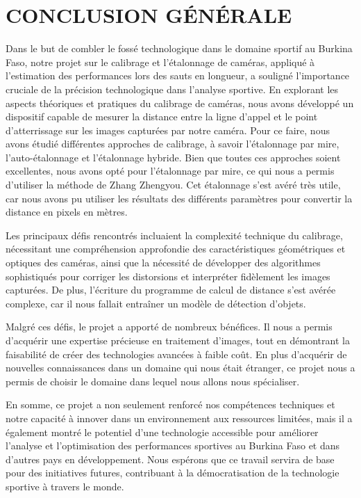 \chapter*{CONCLUSION GÉNÉRALE}
\adjustmtc
\thispagestyle{MyStyle}


 Dans le but de combler le fossé technologique dans le domaine sportif au Burkina Faso, notre projet sur le calibrage et l'étalonnage de caméras, appliqué à l'estimation des performances lors des sauts en longueur, a souligné l'importance cruciale de la précision technologique dans l'analyse sportive. En explorant les aspects théoriques et pratiques du calibrage de caméras, nous avons développé un dispositif capable de mesurer la distance entre la ligne d'appel et le point d'atterrissage sur les images capturées par notre caméra. Pour ce faire, nous avons étudié différentes approches de calibrage, à savoir l'étalonnage par mire, l'auto-étalonnage et l'étalonnage hybride. Bien que toutes ces approches soient excellentes, nous avons opté pour l'étalonnage par mire, ce qui nous a permis d'utiliser la méthode de Zhang Zhengyou. Cet étalonnage s'est avéré très utile, car nous avons pu utiliser les résultats des différents paramètres pour convertir la distance en pixels en mètres.
 
 Les principaux défis rencontrés incluaient la complexité technique du calibrage, nécessitant une compréhension approfondie des caractéristiques géométriques et optiques des caméras, ainsi que la nécessité de développer des algorithmes sophistiqués pour corriger les distorsions et interpréter fidèlement les images capturées. De plus, l'écriture du programme de calcul de distance s'est avérée complexe, car il nous fallait entraîner un modèle de détection d'objets.
 
 Malgré ces défis, le projet a apporté de nombreux bénéfices. Il nous a permis d'acquérir une expertise précieuse en traitement d'images, tout en démontrant la faisabilité de créer des technologies avancées à faible coût. En plus d'acquérir de nouvelles connaissances dans un domaine qui nous était étranger, ce projet nous a permis de choisir le domaine dans lequel nous allons nous spécialiser.
 
 En somme, ce projet a non seulement renforcé nos compétences techniques et notre capacité à innover dans un environnement aux ressources limitées, mais il a également montré le potentiel d'une technologie accessible pour améliorer l'analyse et l'optimisation des performances sportives au Burkina Faso et dans d'autres pays en développement. Nous espérons que ce travail servira de base pour des initiatives futures, contribuant à la démocratisation de la technologie sportive à travers le monde.